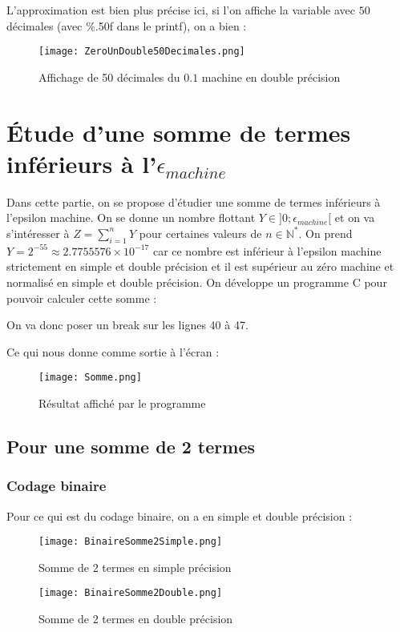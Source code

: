 \documentclass[a4paper, titlepage]{livret} %
\begin{document}
				L'approximation est bien plus précise ici, si l'on affiche la variable avec $50$ décimales (avec \%.50f dans le printf), on a bien :
				\begin{figure}[!h]
					\centering
  						\texttt{[image: ZeroUnDouble50Decimales.png]}
  						\caption{Affichage de 50 décimales du $0.1$ machine en double précision}
				\end{figure}


	\chapter{Étude d'une somme de termes inférieurs à l'$\epsilon_{machine}$}
		Dans cette partie, on se propose d'étudier une somme de termes inférieurs à l'epsilon machine.
		On se donne un nombre flottant $Y \in ]0;\epsilon_{machine}[$ et on va s'intéresser à $Z = \sum_{i = 1}^{n} Y$ pour certaines valeurs de $n \in \mathbb{N}^{*}$.
		On prend $Y = 2^{-55} \approx 2.7755576 \times10^{-17}$ car ce nombre est inférieur à l'epsilon machine strictement en simple et double précision et il est supérieur au zéro machine et normalisé en simple et double précision.
		On développe un programme C pour pouvoir calculer cette somme :
		
		On va donc poser un break sur les lignes 40 à 47.

		Ce qui nous donne comme sortie à l'écran :
		\begin{figure}[!h]
			\centering
  				\texttt{[image: Somme.png]}
  				\caption{Résultat affiché par le programme}
		\end{figure}

		\section{Pour une somme de 2 termes}
			\subsection{Codage binaire}
				Pour ce qui est du codage binaire, on a en simple et double précision :
				\begin{figure}[!h]
					\centering
  						\texttt{[image: BinaireSomme2Simple.png]}
  						\caption{Somme de 2 termes en simple précision}
				\end{figure}
				\begin{figure}[!h]
					\centering
  						\texttt{[image: BinaireSomme2Double.png]}
  						\caption{Somme de 2 termes en double précision}
				\end{figure}
\end{document}
